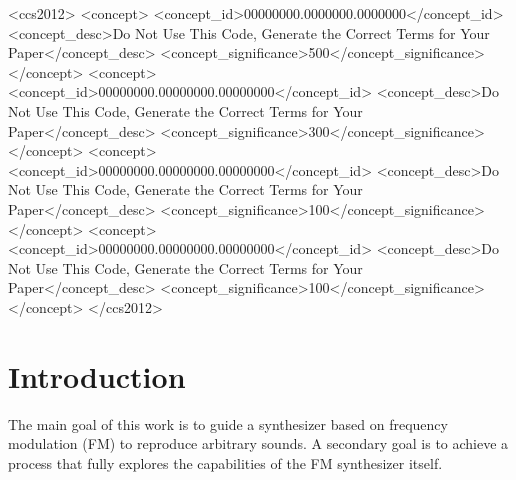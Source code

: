\documentclass[sigconf,natbib=false]{acmart}
\begin{document}
\begin{CCSXML}
<ccs2012>
 <concept>
  <concept_id>00000000.0000000.0000000</concept_id>
  <concept_desc>Do Not Use This Code, Generate the Correct Terms for Your Paper</concept_desc>
  <concept_significance>500</concept_significance>
 </concept>
 <concept>
  <concept_id>00000000.00000000.00000000</concept_id>
  <concept_desc>Do Not Use This Code, Generate the Correct Terms for Your Paper</concept_desc>
  <concept_significance>300</concept_significance>
 </concept>
 <concept>
  <concept_id>00000000.00000000.00000000</concept_id>
  <concept_desc>Do Not Use This Code, Generate the Correct Terms for Your Paper</concept_desc>
  <concept_significance>100</concept_significance>
 </concept>
 <concept>
  <concept_id>00000000.00000000.00000000</concept_id>
  <concept_desc>Do Not Use This Code, Generate the Correct Terms for Your Paper</concept_desc>
  <concept_significance>100</concept_significance>
 </concept>
</ccs2012>
\end{CCSXML}




\maketitle

\section{Introduction}

The main goal of this work is to guide a synthesizer based on frequency modulation (FM) to reproduce arbitrary sounds. A secondary goal is to achieve a process that fully explores the capabilities of the FM synthesizer itself.
\end{document}
